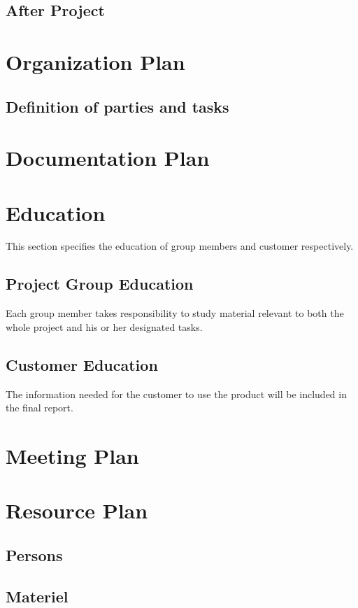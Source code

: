 \documentclass[a4paper,12pt]{article} \usepackage{graphicx}
\begin{document}
\subsection{After Project}
\section{Organization Plan}

\subsection{Definition of parties and tasks}
\section{Documentation Plan}

\section{Education}
This section specifies the education of group members and customer respectively.

\subsection{Project Group Education}
Each group member takes responsibility to study material relevant to both the
whole project and his or her designated tasks. 

\subsection{Customer Education}
The information needed for the customer to use the product will be included in
the final report.

\section{Meeting Plan}

\section{Resource Plan} 
\subsection{Persons} 
\subsection{Materiel}
\end{document}

